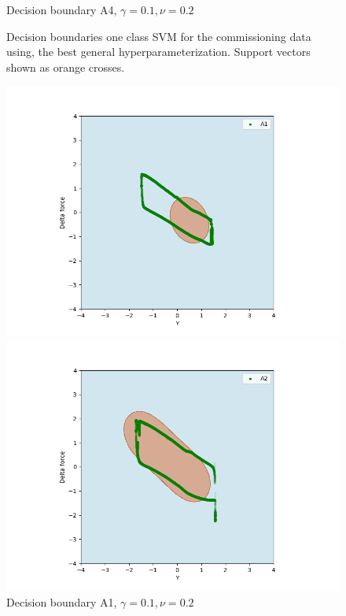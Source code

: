 \begin{figure}[]
\begin{minipage}[b]{0.5\linewidth}
                    \caption*{Decision boundary A4, $\gamma = 0.1, \nu = 0.2$}
                \end{minipage}
                \hfill
                \caption{Decision boundaries one class SVM for the commissioning data using, the best general hyperparameterization. Support vectors shown as orange crosses.}
                \label{fig:one_svm_commissioning}
            \end{figure}
            
            \begin{figure}[]
                \begin{minipage}[b]{0.5\linewidth}
                    \centering
                    \includegraphics[width = \textwidth]{figures/analysis/one_class_startup/SVM_OC_startup_no_servo_g02_nu01_A1.png}
                    \caption*{Decision boundary A1, $\gamma = 0.1, \nu = 0.2$}
                \end{minipage}
                \hfill
                \begin{minipage}[b]{0.5\linewidth}
                    \centering
                    \includegraphics[width = \textwidth]{figures/analysis/one_class_startup/SVM_OC_startup_no_servo_g02_nu01_A2.png}

\end{minipage}
\end{figure}
